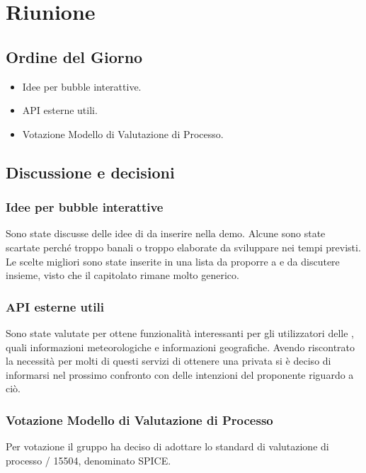 \section{Riunione}
\subsection{Ordine del Giorno}
\begin{itemize}
	\item Idee per bubble interattive.
	\item API esterne utili.
	\item Votazione Modello di Valutazione di Processo.
\end{itemize}

\subsection{Discussione e decisioni}
\subsubsection{Idee per bubble interattive}
Sono state discusse delle idee di  da inserire nella demo. Alcune sono state scartate perché troppo banali o troppo elaborate da sviluppare nei tempi previsti. Le scelte migliori sono state inserite in una lista da proporre a \Proponente{} e da discutere insieme, visto che il capitolato rimane molto generico.

\subsubsection{API esterne utili}
Sono state valutate  per ottene funzionalità interessanti per gli utilizzatori delle , quali informazioni meteorologiche e informazioni geografiche. Avendo riscontrato la necessità per molti di questi servizi di ottenere una  privata si è deciso di informarsi nel prossimo confronto con \Proponente{} delle intenzioni del proponente riguardo a ciò.  

\subsubsection{Votazione Modello di Valutazione di Processo}
Per votazione il gruppo \GroupName{} ha deciso di adottare lo standard di valutazione di processo / 15504, denominato SPICE.

\clearpage
